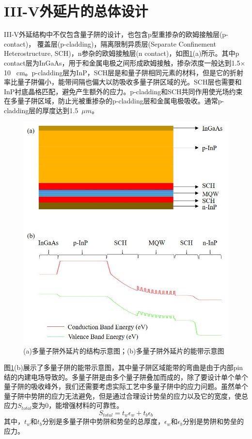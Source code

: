 \section{III-V外延片的总体设计}
III-V外延结构中不仅包含量子阱的设计，也包含p型重掺杂的欧姆接触层(p-contact)， 覆盖层(p-cladding)，隔离限制异质层(Separate Confinement Heterostructure, SCH)，n参杂的欧姆接触层(n contact)，如图\ref{fig_ch2_banddiagram}(a)所示。其中p contact层为InGaAs，用于和金属电极之间形成欧姆接触，掺杂浓度一般达到1.5$\times$10 ~cm。p-cladding层为InP，SCH层是和量子阱相同元素的材料，但是它的折射率比量子阱偏小，能带间隔也偏大以防吸收多量子阱区域的光。SCH层也需要和InP衬底晶格匹配，避免产生额外的应力。p-cladding和SCH共同作用使光场约束在多量子阱区域，防止光被重掺杂的p-cladding层和金属电极吸收。通常p-cladding层的厚度达到1.5~$\mu m$。
\begin{figure}[htb]
	\centering
	\includegraphics[width=12cm]{./Pictures/fig_ch2_banddiagram.jpg}
	\caption{(a)多量子阱外延片的结构示意图；(b)多量子阱外延片的能带示意图}
	\label{fig_ch2_banddiagram}
\end{figure}

图\ref{fig_ch2_banddiagram}(b)展示了多量子阱的能带示意图，其中量子阱区域能带的弯曲是由于内部pin结的内建电场导致的。多量子阱是由多个量子阱叠加而成的，除了要设计单个单个量子阱的吸收峰外，我们还需要考虑实际工艺中多量子阱中的应力问题。虽然单个量子阱中势阱的应力无法避免，但是通过合理设计势垒的应力以及它的宽度，使总应力$S_{total}$变为0，能增强材料的可靠性\cite{chen2011high}。
\begin{equation}
\label{Equ:strain_net}
S_{total} = t_{w}\epsilon_{w}+t_b\epsilon_b
\end{equation}
其中，$t_{w}$和$t_{b}$分别是多量子阱中势阱和势垒的总厚度，$\epsilon_w$和$\epsilon_b$分别是势阱和势垒的应力。


